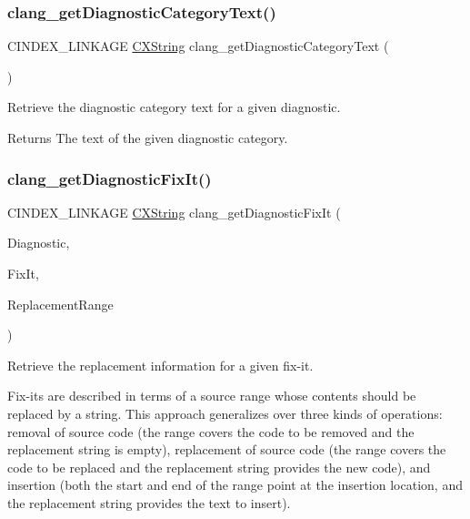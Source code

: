 \subsubsection{\texorpdfstring{clang\+\_\+get\+Diagnostic\+Category\+Text()}{clang\_getDiagnosticCategoryText()}}
{\footnotesize\ttfamily C\+I\+N\+D\+E\+X\+\_\+\+L\+I\+N\+K\+A\+GE \mbox{\hyperlink{structCXString}{C\+X\+String}} clang\+\_\+get\+Diagnostic\+Category\+Text (\begin{DoxyParamCaption}\item[{\mbox{\hyperlink{group__CINDEX__DIAG_ga44bb8aba7c40590ad25d1763c4fbff7f}{C\+X\+Diagnostic}}}]{ }\end{DoxyParamCaption})}



Retrieve the diagnostic category text for a given diagnostic. 

\begin{DoxyReturn}{Returns}
The text of the given diagnostic category. 
\end{DoxyReturn}
\mbox{\label{group__CINDEX__DIAG_gadf990bd68112475c5c07b19c1fe3938a}} 
\subsubsection{\texorpdfstring{clang\+\_\+get\+Diagnostic\+Fix\+It()}{clang\_getDiagnosticFixIt()}}
{\footnotesize\ttfamily C\+I\+N\+D\+E\+X\+\_\+\+L\+I\+N\+K\+A\+GE \mbox{\hyperlink{structCXString}{C\+X\+String}} clang\+\_\+get\+Diagnostic\+Fix\+It (\begin{DoxyParamCaption}\item[{\mbox{\hyperlink{group__CINDEX__DIAG_ga44bb8aba7c40590ad25d1763c4fbff7f}{C\+X\+Diagnostic}}}]{Diagnostic,  }\item[{unsigned}]{Fix\+It,  }\item[{\mbox{\hyperlink{structCXSourceRange}{C\+X\+Source\+Range}} $\ast$}]{Replacement\+Range }\end{DoxyParamCaption})}



Retrieve the replacement information for a given fix-\/it. 

Fix-\/its are described in terms of a source range whose contents should be replaced by a string. This approach generalizes over three kinds of operations\+: removal of source code (the range covers the code to be removed and the replacement string is empty), replacement of source code (the range covers the code to be replaced and the replacement string provides the new code), and insertion (both the start and end of the range point at the insertion location, and the replacement string provides the text to insert).


